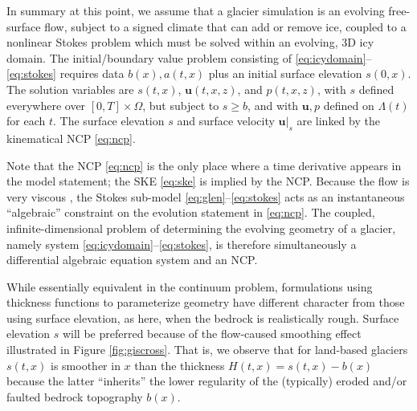 \documentclass[hidelinks,onefignum,onetabnum,final]{siamart220329}  %
\newcommand{\bu}{\mathbf{u}}
\begin{document}
In summary at this point, we assume that a glacier simulation is an evolving free-surface flow, subject to a signed climate that can add or remove ice, coupled to a nonlinear Stokes problem which must be solved within an evolving, 3D icy domain.  The initial/boundary value problem consisting of \eqref{eq:icydomain}--\eqref{eq:stokes} requires data $b(x),a(t,x)$ plus an initial surface elevation $s(0,x)$.  The solution variables are $s(t,x)$, $\bu(t,x,z)$, and $p(t,x,z)$, with $s$ defined everywhere over $[0,T]\times \Omega$, but subject to $s \ge b$, and with $\bu,p$ defined on $\Lambda(t)$ for each $t$.  The surface elevation $s$ and surface velocity $\bu|_s$ are linked by the kinematical NCP \eqref{eq:ncp}.

Note that the NCP \eqref{eq:ncp} is the only place where a time derivative appears in the model statement; the SKE \eqref{eq:ske} is implied by the NCP.  Because the flow is very viscous \cite{Acheson1990}, the Stokes sub-model \eqref{eq:glen}--\eqref{eq:stokes} acts as an instantaneous ``algebraic'' constraint on the evolution statement in \eqref{eq:ncp}.  The coupled, infinite-dimensional problem of determining the evolving geometry of a glacier, namely system \eqref{eq:icydomain}--\eqref{eq:stokes}, is therefore simultaneously a differential algebraic equation system \cite{AscherPetzold1998,LofgrenAhlkronaHelanow2022} and an NCP.

While essentially equivalent in the continuum problem, formulations using thickness functions to parameterize geometry have different character from those using surface elevation, as here, when the bedrock is realistically rough.  Surface elevation $s$ will be preferred because of the flow-caused smoothing effect illustrated in Figure \ref{fig:giscross}.  That is, we observe that for land-based glaciers $s(t,x)$ is smoother in $x$ than the thickness $H(t,x) = s(t,x)-b(x)$ because the latter ``inherits'' the lower regularity of the (typically) eroded and/or faulted bedrock topography $b(x)$.
\end{document}
